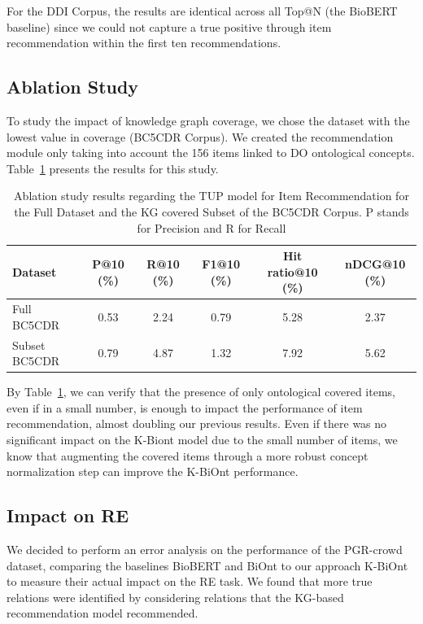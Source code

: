 For the DDI Corpus, the results are identical across all Top@N (the BioBERT baseline) since we could not capture a true positive through item recommendation within the first ten recommendations. 


\subsection{Ablation Study}

To study the impact of knowledge graph coverage, we chose the dataset with the lowest value in coverage (BC5CDR Corpus). We created the recommendation module only taking into account the 156 items linked to DO ontological concepts. Table~\ref{tab:final_results_ab} presents the results for this study. 

\begin{table}[h]
\centering
  \caption[Ablation Study Results Regarding the TUP model for Item Recommendation]{Ablation study results regarding the TUP model for Item Recommendation for the Full Dataset and the KG covered Subset of the BC5CDR Corpus. P stands for Precision and R for Recall}
  \label{tab:final_results_ab}
  \begin{tabular}{lccccc}
    \hline
    Dataset & P@10 (\%) & R@10 (\%) & F1@10 (\%) & Hit ratio@10 (\%) & nDCG@10 (\%) \\
    \hline
    Full BC5CDR & 0.53 & 2.24 & 0.79 & 5.28 & 2.37 \\
    \hline
    Subset BC5CDR & 0.79 & 4.87 & 1.32 & 7.92 & 5.62 \\
    \hline
  \end{tabular}
\end{table}

By Table~\ref{tab:final_results_ab}, we can verify that the presence of only ontological covered items, even if in a small number, is enough to impact the performance of item recommendation, almost doubling our previous results. Even if there was no significant impact on the K-Biont model due to the small number of items, we know that augmenting the covered items through a more robust concept normalization step can improve the K-BiOnt performance. 

\subsection{Impact on RE}

We decided to perform an error analysis on the performance of the PGR-crowd dataset, comparing the baselines BioBERT and BiOnt to our approach K-BiOnt to measure their actual impact on the RE task. We found that more true relations were identified by considering relations that the KG-based recommendation model recommended.  

